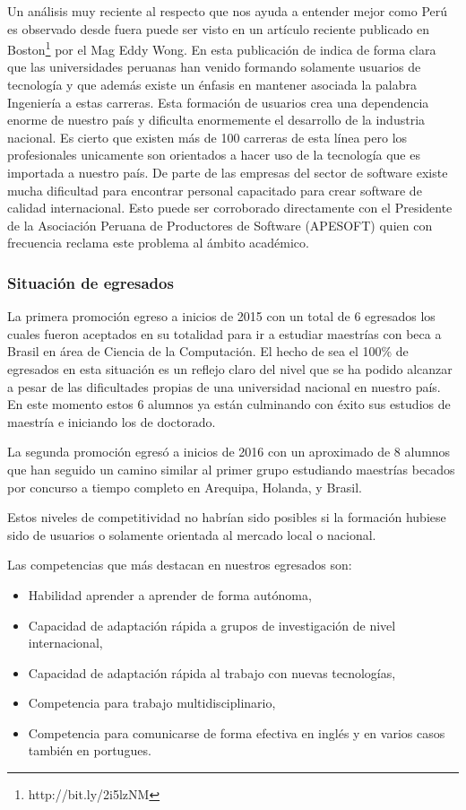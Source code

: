 Un análisis muy reciente al respecto que nos ayuda a entender mejor como Perú es observado desde fuera puede ser visto en un 
artí­culo reciente publicado en Boston\footnote{http://bit.ly/2i5lzNM} por el Mag Eddy Wong.
En esta publicación de indica de forma clara que las universidades peruanas han venido formando solamente usuarios de tecnologí­a y 
que además existe un énfasis en mantener asociada la palabra Ingenierí­a a estas carreras.
Esta formación de usuarios crea una dependencia enorme de nuestro paí­s y dificulta enormemente el desarrollo de la industria nacional.
Es cierto que existen más de 100 carreras de esta lí­nea pero los profesionales unicamente son orientados a hacer uso de la tecnologí­a que es importada a nuestro paí­s.
De parte de las empresas del sector de software existe mucha dificultad para encontrar personal capacitado para crear software de calidad internacional.
Esto puede ser corroborado directamente con el Presidente de la Asociación Peruana de Productores de Software (APESOFT) 
quien con frecuencia reclama este problema al ámbito académico.

\subsubsection{Situación de egresados}
La primera promoción egreso a inicios de 2015 con un total de 6 egresados los cuales fueron aceptados en su totalidad 
para ir a estudiar maestrí­as con beca a Brasil en área de Ciencia de la Computación.
El hecho de sea el 100\% de egresados en esta situación es un reflejo claro del nivel que se ha podido alcanzar a 
pesar de las dificultades propias de una universidad nacional en nuestro paí­s.
En este momento estos 6 alumnos ya están culminando con éxito sus estudios de maestrí­a e iniciando los de doctorado.

La segunda promoción egresó a inicios de 2016 con un aproximado de 8 alumnos que han seguido un camino similar al primer 
grupo estudiando maestrí­as becados por concurso a tiempo completo en Arequipa, Holanda, y Brasil.

Estos niveles de competitividad no habrí­an sido posibles si la formación hubiese sido de usuarios o 
solamente orientada al mercado local o nacional. 

Las competencias que más destacan en nuestros egresados son:
\begin{itemize}
\item Habilidad aprender a aprender de forma autónoma,
\item Capacidad de adaptación rápida a grupos de investigación de nivel internacional,
\item Capacidad de adaptación rápida al trabajo con nuevas tecnologí­as,
\item Competencia para trabajo multidisciplinario,
\item Competencia para comunicarse de forma efectiva en inglés y en varios casos también en portugues.
\end{itemize}

